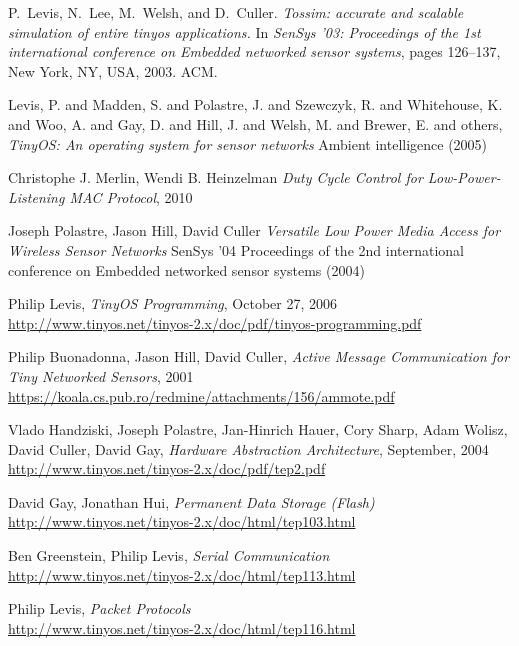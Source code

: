 \begin{thebibliography}{99}
  P.~Levis, N.~Lee, M.~Welsh, and D.~Culler.
  \textit{Tossim: accurate and scalable
  simulation of entire tinyos applications.}
  \newblock In {\em SenSys '03: Proceedings of the
  1st international conference on Embedded
  networked sensor systems}, pages 126--137, New
  York, NY, USA, 2003. ACM.

  Levis, P. and Madden, S. and Polastre, J. and Szewczyk, R. and Whitehouse, K. and Woo, A. and Gay, D. and Hill, J. and Welsh, M. and Brewer, E. and others,
  \textit{TinyOS: An operating system for sensor networks}
  Ambient intelligence (2005)

  Christophe J. Merlin, Wendi B. Heinzelman
  \textit{Duty Cycle Control for Low-Power-Listening MAC Protocol}, 2010 

  Joseph Polastre, Jason Hill, David Culler
  \textit{Versatile Low Power Media Access for Wireless Sensor Networks}
  SenSys '04 Proceedings of the 2nd international conference on Embedded networked sensor systems (2004)


  Philip Levis, \textit{TinyOS Programming}, October 27, 2006 \\
  \url{http://www.tinyos.net/tinyos-2.x/doc/pdf/tinyos-programming.pdf}

  Philip Buonadonna, Jason Hill, David Culler,
  \textit{Active Message Communication for Tiny Networked Sensors}, 2001 \\
  \url{https://koala.cs.pub.ro/redmine/attachments/156/ammote.pdf}

  Vlado Handziski, Joseph Polastre, Jan-Hinrich Hauer, Cory Sharp,
  Adam Wolisz, David Culler, David Gay, \textit{Hardware Abstraction Architecture}, September,  2004 \\
  \url{http://www.tinyos.net/tinyos-2.x/doc/pdf/tep2.pdf}

  David Gay, Jonathan Hui, \textit{Permanent Data Storage (Flash)} \\
  \url{http://www.tinyos.net/tinyos-2.x/doc/html/tep103.html}

  Ben Greenstein, Philip Levis, \textit{Serial Communication} \\
  \url{http://www.tinyos.net/tinyos-2.x/doc/html/tep113.html}

  Philip Levis, \textit{Packet Protocols} \\
  \url{http://www.tinyos.net/tinyos-2.x/doc/html/tep116.html}


\end{thebibliography}
